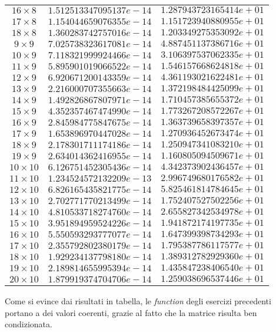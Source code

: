 \begin{longtable}{|c|c|c|}
		$16 \times 8$ & $1.512513347095137e-14$ & $1.287943723165414e+01$ \\
		$17 \times 8$ & $1.154044659076355e-14$ & $1.151723940880955e+01$ \\
		$18 \times 8$ & $1.360283742757016e-14$ & $1.203349275353092e+01$ \\
		$9  \times 9$ & $7.025738323617081e-14$ & $4.887451137386716e+01$ \\
		$10 \times 9$ & $7.118321999924466e-14$ & $3.106397537062335e+01$ \\
		$11 \times 9$ & $5.895901019066522e-14$ & $1.546157668624818e+01$ \\
		$12 \times 9$ & $6.920671200143359e-14$ & $4.361193021622481e+01$ \\
		$13 \times 9$ & $2.216000707355663e-14$ & $1.372198484425099e+01$ \\
		$14 \times 9$ & $1.492826867807971e-14$ & $1.710457385655372e+01$ \\
		$15 \times 9$ & $4.352357467474990e-14$ & $1.773267208572267e+01$ \\
		$16 \times 9$ & $2.845984775847675e-14$ & $1.363739658397357e+01$ \\
		$17 \times 9$ & $1.653896970447028e-14$ & $1.270936452673474e+01$ \\
		$18 \times 9$ & $2.178301711174186e-14$ & $1.250947341083210e+01$ \\
		$19 \times 9$ & $2.634014362416955e-14$ & $1.160805094509671e+01$ \\
		$10\times 10$ & $6.126751452305436e-14$ & $4.342373902436457e+01$ \\
		$11\times 10$ & $1.234524572132209e-13$ & $2.996749680176582e+01$ \\
		$12\times 10$ & $6.826165435821775e-14$ & $5.825461814784645e+01$ \\
		$13\times 10$ & $2.702771770213499e-14$ & $1.752407527502256e+01$ \\
		$14\times 10$ & $4.810533718274760e-14$ & $2.655827342534978e+01$ \\
		$15\times 10$ & $3.951894959524226e-14$ & $1.941872174197735e+01$ \\
		$16\times 10$ & $5.550593293777077e-14$ & $1.647399398734293e+01$ \\
		$17\times 10$ & $2.355792802380179e-14$ & $1.795387786117577e+01$ \\
		$18\times 10$ & $1.929234137798180e-14$ & $1.389312782929360e+01$ \\
		$19\times 10$ & $2.189814655995394e-14$ & $1.435847238406540e+01$ \\
		$20\times 10$ & $1.879919374704706e-14$ & $1.259038696537446e+01$ \\
		\hline
\end{longtable}
Come si evince dai risultati in tabella, le \textit{function} degli esercizi precedenti portano a dei valori coerenti, grazie al fatto che la matrice risulta ben condizionata.
